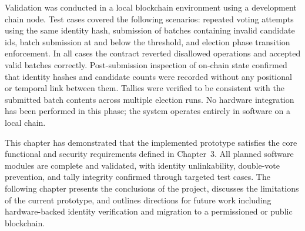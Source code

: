 Validation was conducted in a local blockchain environment using a development chain node. Test cases covered the following scenarios: repeated voting attempts using the same identity hash, submission of batches containing invalid candidate \glspl{id}, batch submission at and below the threshold, and election phase transition enforcement. In all cases the contract reverted disallowed operations and accepted valid batches correctly. Post-submission inspection of on-chain state confirmed that identity hashes and candidate counts were recorded without any positional or temporal link between them. Tallies were verified to be consistent with the submitted batch contents across multiple election runs. No hardware integration has been performed in this phase; the system operates entirely in software on a local chain.
 
This chapter has demonstrated that the implemented prototype satisfies the core functional and security requirements defined in Chapter~3. All planned software modules are complete and validated, with identity unlinkability, double-vote prevention, and tally integrity confirmed through targeted test cases. The following chapter presents the conclusions of the project, discusses the limitations of the current prototype, and outlines directions for future work including hardware-backed identity verification and migration to a permissioned or public blockchain.
 
